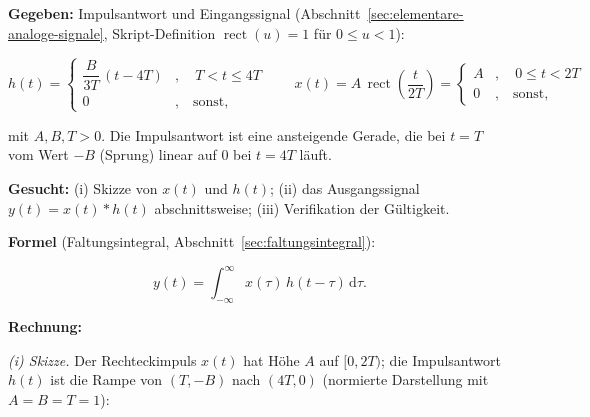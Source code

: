 \begin{beispiel}

\textbf{Gegeben:} Impulsantwort und Eingangssignal
(Abschnitt~\ref{sec:elementare-analoge-signale}, Skript-Definition
$\operatorname{rect}(u) = 1$ für $0 \leq u < 1$):

$$
h(t) = \begin{cases} \dfrac{B}{3T}\,(t - 4T) & , \quad T < t \leq 4T \\[6pt]
0 & , \quad \text{sonst,} \end{cases}
\qquad
x(t) = A\,\operatorname{rect}\!\left(\frac{t}{2T}\right)
= \begin{cases} A & , \quad 0 \leq t < 2T \\[2pt] 0 & , \quad \text{sonst,} \end{cases}
$$

mit $A, B, T > 0$. Die Impulsantwort ist eine ansteigende Gerade, die bei
$t = T$ vom Wert $-B$ (Sprung) linear auf $0$ bei $t = 4T$ läuft.

\textbf{Gesucht:} (i) Skizze von $x(t)$ und $h(t)$; (ii) das Ausgangssignal
$y(t) = x(t) * h(t)$ abschnittsweise; (iii) Verifikation der Gültigkeit.

\textbf{Formel} (Faltungsintegral, Abschnitt~\ref{sec:faltungsintegral}):

$$
y(t) = \int_{-\infty}^{\infty} x(\tau)\, h(t - \tau)\,\mathrm{d}\tau.
$$

\textbf{Rechnung:}

\emph{(i) Skizze.} Der Rechteckimpuls $x(t)$ hat Höhe $A$ auf $[0, 2T)$; die
Impulsantwort $h(t)$ ist die Rampe von $(T, -B)$ nach $(4T, 0)$
(normierte Darstellung mit $A = B = T = 1$):

\begin{center}
\end{center}


\end{beispiel}
